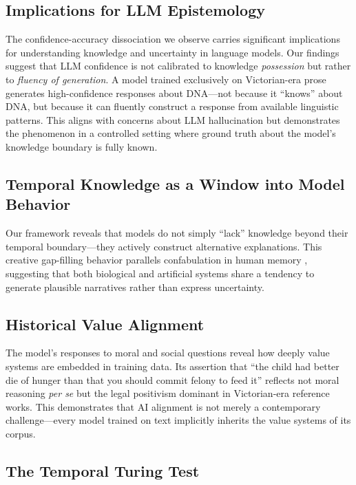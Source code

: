 \documentclass[11pt]{article}
\begin{document}
\subsection{Implications for LLM Epistemology}

The confidence-accuracy dissociation we observe carries significant implications for understanding knowledge and uncertainty in language models. Our findings suggest that LLM confidence is not calibrated to knowledge \textit{possession} but rather to \textit{fluency of generation}. A model trained exclusively on Victorian-era prose generates high-confidence responses about DNA---not because it ``knows'' about DNA, but because it can fluently construct a response from available linguistic patterns. This aligns with concerns about LLM hallucination \cite{ji2023survey} but demonstrates the phenomenon in a controlled setting where ground truth about the model's knowledge boundary is fully known.

\subsection{Temporal Knowledge as a Window into Model Behavior}

Our framework reveals that models do not simply ``lack'' knowledge beyond their temporal boundary---they actively construct alternative explanations. This creative gap-filling behavior parallels confabulation in human memory \cite{loftus1979eyewitness}, suggesting that both biological and artificial systems share a tendency to generate plausible narratives rather than express uncertainty.

\subsection{Historical Value Alignment}

The model's responses to moral and social questions reveal how deeply value systems are embedded in training data. Its assertion that ``the child had better die of hunger than that you should commit felony to feed it'' reflects not moral reasoning \textit{per se} but the legal positivism dominant in Victorian-era reference works. This demonstrates that AI alignment is not merely a contemporary challenge---every model trained on text implicitly inherits the value systems of its corpus.

\subsection{The Temporal Turing Test}
\end{document}
